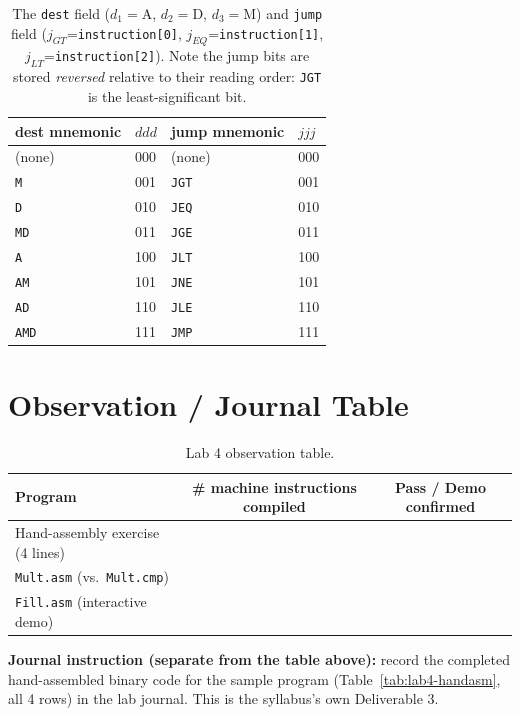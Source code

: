 \documentclass[11pt]{article}
\begin{document}
\begin{table}[h]
\centering
\small
\begin{tabular}{@{}l l@{\qquad\qquad}l l@{}}
\toprule
dest mnemonic & $ddd$ & jump mnemonic & $jjj$ \\
\midrule
(none) & 000 & (none) & 000 \\
\texttt{M} & 001 & \texttt{JGT} & 001 \\
\texttt{D} & 010 & \texttt{JEQ} & 010 \\
\texttt{MD} & 011 & \texttt{JGE} & 011 \\
\texttt{A} & 100 & \texttt{JLT} & 100 \\
\texttt{AM} & 101 & \texttt{JNE} & 101 \\
\texttt{AD} & 110 & \texttt{JLE} & 110 \\
\texttt{AMD} & 111 & \texttt{JMP} & 111 \\
\bottomrule
\end{tabular}
\caption{The \texttt{dest} field ($d_1{=}$A, $d_2{=}$D, $d_3{=}$M) and \texttt{jump} field ($j_{GT}$=\texttt{instruction[0]}, $j_{EQ}$=\texttt{instruction[1]}, $j_{LT}$=\texttt{instruction[2]}). Note the jump bits are stored \emph{reversed} relative to their reading order: \texttt{JGT} is the least-significant bit.}
\label{tab:lab4-dest-jump}
\end{table}

\section{Observation / Journal Table}

\begin{table}[h]
\centering
\small
\begin{tabular}{@{}l c c@{}}
\toprule
Program & \# machine instructions compiled & Pass / Demo confirmed \\
\midrule
Hand-assembly exercise (4 lines) & & \\
\texttt{Mult.asm} (vs.\ \texttt{Mult.cmp}) & & \\
\texttt{Fill.asm} (interactive demo) & & \\
\bottomrule
\end{tabular}
\caption{Lab 4 observation table.}
\label{tab:lab4-observations}
\end{table}

\noindent\textbf{Journal instruction (separate from the table above):} record the completed hand-assembled binary code for the sample program (Table~\ref{tab:lab4-handasm}, all 4 rows) in the lab journal. This is the syllabus's own Deliverable 3.
\end{document}
